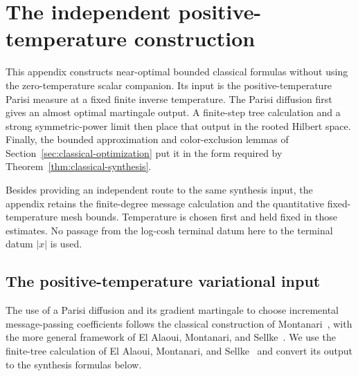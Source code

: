 \section{The independent positive-temperature construction}
\label{sec:positive-temperature-alternative}

This appendix constructs near-optimal bounded classical formulas
without using the zero-temperature scalar companion.  Its input is the
positive-temperature Parisi measure at a fixed finite inverse
temperature.  The Parisi diffusion first gives an almost optimal
martingale output.  A finite-step tree calculation and a strong
symmetric-power limit then place that output in the rooted Hilbert
space.  Finally, the bounded approximation and color-exclusion lemmas
of Section~\ref{sec:classical-optimization} put it in the form required
by Theorem~\ref{thm:classical-synthesis}.

Besides providing an independent route to the same synthesis input,
the appendix retains the finite-degree message calculation and the
quantitative fixed-temperature mesh bounds.  Temperature is chosen
first and held fixed in those estimates.  No passage from the
log-cosh terminal datum here to the terminal datum $|x|$ is used.

\subsection{The positive-temperature variational input}

The use of a Parisi diffusion and its gradient martingale to choose
incremental message-passing coefficients follows the classical
construction of Montanari~\cite[Section~3.1, Lemmas~3.2--3.3]{Montanari2019},
with the more general framework of El Alaoui, Montanari, and
Sellke~\cite[Assumption~1 and Theorem~2]{AMS2020}. We use the finite-tree
calculation of El Alaoui, Montanari, and Sellke~\cite{EAMS2023} and
convert its output to the synthesis formulas below.

